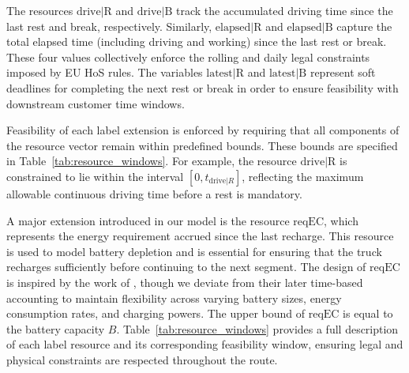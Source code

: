 \documentclass[trsc,dblanonrev]{informs4}
\begin{document}
The resources \( \text{drive|R} \) and \( \text{drive|B} \) track the accumulated driving time since the last rest and break, respectively. Similarly, \( \text{elapsed|R} \) and \( \text{elapsed|B} \) capture the total elapsed time (including driving and working) since the last rest or break. These four values collectively enforce the rolling and daily legal constraints imposed by EU HoS rules. The variables \( \text{latest|R} \) and \( \text{latest|B} \) represent soft deadlines for completing the next rest or break in order to ensure feasibility with downstream customer time windows.

Feasibility of each label extension is enforced by requiring that all components of the resource vector remain within predefined bounds. These bounds are specified in Table~\ref{tab:resource_windows}. For example, the resource \( \text{drive|R} \) is constrained to lie within the interval \([0, t_{\text{drive}|R}]\), reflecting the maximum allowable continuous driving time before a rest is mandatory.

A major extension introduced in our model is the resource \( \text{reqEC} \), which represents the energy requirement accrued since the last recharge. This resource is used to model battery depletion and is essential for ensuring that the truck recharges sufficiently before continuing to the next segment. The design of \( \text{reqEC} \) is inspired by the work of \citet{desaulniers2016exact}, though we deviate from their later time-based accounting to maintain flexibility across varying battery sizes, energy consumption rates, and charging powers. The upper bound of \( \text{reqEC} \) is equal to the battery capacity \( B \). Table~\ref{tab:resource_windows} provides a full description of each label resource and its corresponding feasibility window, ensuring legal and physical constraints are respected throughout the route.
\end{document}
